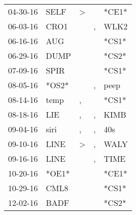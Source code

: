 \begin{supertabular}{p{0.07\textwidth}p{0.06\textwidth}p{0.02\textwidth}p{0.02\textwidth}p{0.06\textwidth}}
          04-30-16\textsuperscript{} &           SELF\textsuperscript{} &     \textgreater &                  &                            *CE1* \\
          06-03-16\textsuperscript{} &           CRO1\textsuperscript{} &                  &                , &           WLK2\textsuperscript{} \\
          06-16-16\textsuperscript{} &            AUG\textsuperscript{} &                  &                  &                            *CS1* \\
          06-29-16\textsuperscript{} &           DUMP\textsuperscript{} &                  &                  &                            *CS2* \\
          07-09-16\textsuperscript{} &           SPIR\textsuperscript{} &                  &                  &                            *CS1* \\
          08-05-16\textsuperscript{} &                            *OS2* &                  &                , &           peep\textsuperscript{} \\
          08-14-16\textsuperscript{} &           temp\textsuperscript{} &                , &                  &                            *CS1* \\
          08-18-16\textsuperscript{} &            LIE\textsuperscript{} &                , &                , &           KIMB\textsuperscript{} \\
          09-04-16\textsuperscript{} &           siri\textsuperscript{} &                , &                , &            40s\textsuperscript{} \\
          09-10-16\textsuperscript{} &           LINE\textsuperscript{} &     \textgreater &                , &           WALY\textsuperscript{} \\
          09-16-16\textsuperscript{} &           LINE\textsuperscript{} &                  &                , &           TIME\textsuperscript{} \\
          10-20-16\textsuperscript{} &                            *OE1* &                  &                  &                            *CE1* \\
          10-29-16\textsuperscript{} &           CML8\textsuperscript{} &                  &                  &                            *CS1* \\
          12-02-16\textsuperscript{} &           BADF\textsuperscript{} &                  &                  &                            *CS2* \\

\end{supertabular}
